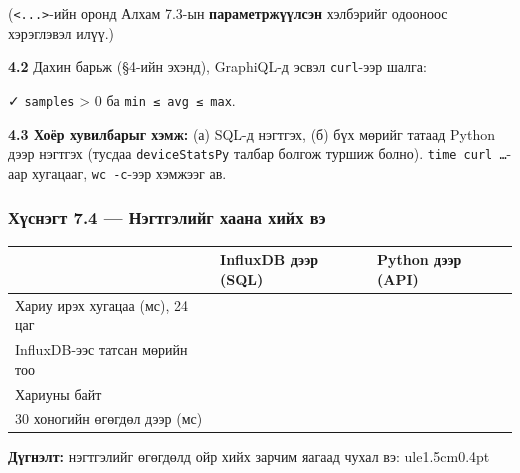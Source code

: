 (\texttt{\textquotesingle{}\textless{}...\textgreater{}\textquotesingle{}}-ийн оронд Алхам 7.3-ын \textbf{параметржүүлсэн} хэлбэрийг одооноос хэрэглэвэл илүү.)

\textbf{4.2} Дахин барьж (§4-ийн эхэнд), GraphiQL-д эсвэл \texttt{curl}-ээр шалга:

\begin{Shaded}
\begin{Highlighting}[]
 \KeywordTok{\textbackslash{}}
    \KeywordTok{|} 
\end{Highlighting}
\end{Shaded}

✓ \texttt{samples} \textgreater{} 0 ба \texttt{min\ ≤\ avg\ ≤\ max}.

\textbf{4.3 Хоёр хувилбарыг хэмж:} (а) SQL-д нэгтгэх, (б) бүх мөрийг татаад Python дээр нэгтгэх (тусдаа \texttt{deviceStatsPy} талбар болгож туршиж болно). \texttt{time\ curl\ \ldots{}}-аар хугацааг, \texttt{wc\ -c}-ээр хэмжээг ав.

\hypertarget{ux445ux4afux441ux43dux44dux433ux442-7.4-ux43dux44dux433ux442ux433ux44dux43bux438ux439ux433-ux445ux430ux430ux43dux430-ux445ux438ux439ux445-ux432ux44d}{%
\subsubsection{Хүснэгт 7.4 --- Нэгтгэлийг хаана хийх вэ}\label{ux445ux4afux441ux43dux44dux433ux442-7.4-ux43dux44dux433ux442ux433ux44dux43bux438ux439ux433-ux445ux430ux430ux43dux430-ux445ux438ux439ux445-ux432ux44d}}

\begingroup\scriptsize\begin{longtable}[]{@{}lll@{}}
\toprule
& InfluxDB дээр (SQL) & Python дээр (API)\tabularnewline
\midrule
\endhead
Хариу ирэх хугацаа (мс), 24 цаг & &\tabularnewline
InfluxDB-ээс татсан мөрийн тоо & &\tabularnewline
Хариуны байт & &\tabularnewline
30 хоногийн өгөгдөл дээр (мс) & &\tabularnewline
\bottomrule
\end{longtable}\endgroup

\textbf{Дүгнэлт:} нэгтгэлийг өгөгдөлд ойр хийх зарчим яагаад чухал вэ: ule{1.5cm}{0.4pt}

